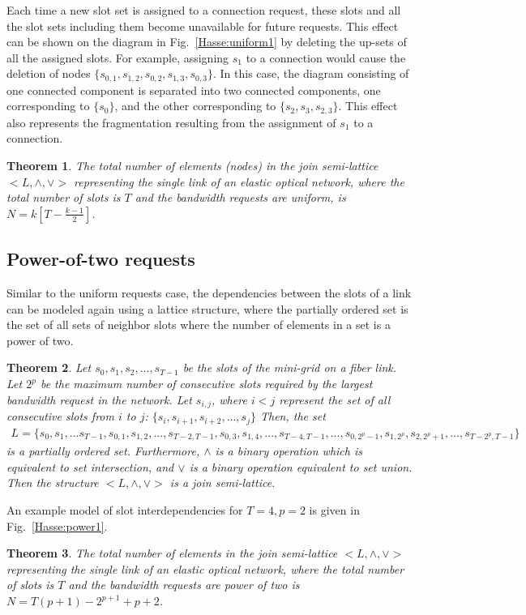 \documentclass[letterpaper,10pt]{article}\pdfoutput=1
\newtheorem{theorem}{Theorem}
\begin{document}
Each time a new slot set is assigned to a connection request, these slots and all the slot sets
including them become unavailable for future requests. This effect can be shown on the diagram in 
Fig.~\ref{Hasse:uniform1} by deleting the up-sets of all the assigned slots. For example, assigning $s_1$ to
a connection would cause the deletion of nodes $\{s_{0,1}, s_{1,2}, s_{0,2}, s_{1,3}, s_{0,3}\}$. In this case,
the diagram consisting of one connected component is separated into two connected components, one corresponding
to $\{s_0\}$, and the other corresponding to $\{s_2, s_3, s_{2,3}\}$. This effect also represents 
the fragmentation resulting from the assignment of $s_1$ to a connection.
\begin{theorem}The total number of elements (nodes) in the join semi-lattice $<L, \wedge, \vee>$ representing the single link of an
elastic optical network, where the total number of slots is $T$ and the bandwidth requests are uniform, is
$N = k \left[ T - \frac{k - 1}{2} \right]$.
\end{theorem}

\subsection{Power-of-two requests}
Similar to the uniform requests case, the dependencies between the slots of a link can be modeled again using a 
lattice structure, where the partially ordered set is the set of all sets of neighbor slots where the number
of elements in a set is a power of two.
\begin{theorem}
Let $s_0, s_1, s_2, ..., s_{T-1}$ be the slots of the mini-grid on a fiber link. 
Let $2^p$ be the maximum number of consecutive slots required by the largest bandwidth request in the network.
Let $s_{i,j}$, where $i < j$ represent the set of all consecutive slots from $i$ to $j$: 
$\{s_{i}, s_{i+1}, s_{i+2}, ..., s_{j}\}$
Then, the set
\begin{eqnarray*}
L = \{s_0, s_1, ... s_{T-1},
s_{0,1}, s_{1,2}, ..., s_{T-2,T-1},
s_{0,3}, s_{1,4}, ..., s_{T-4,T-1},
...,
s_{0,2^{p}-1}, s_{1,2^{p}}, s_{2,2^{p}+1}, ..., s_{T-2^{p}, T-1}\}
\end{eqnarray*}
is a partially ordered set. Furthermore, $\wedge$ is a binary operation which is equivalent to set intersection, 
and $\vee$ is a binary operation equivalent to set union. Then the structure $< L, \wedge, \vee >$ is a join semi-lattice.
\end{theorem}
An example model of slot interdependencies for $T = 4, p = 2$ is given in Fig.~\ref{Hasse:power1}.
\begin{theorem}The total number of elements in the join semi-lattice $<L, \wedge, \vee>$ representing the single link of an
elastic optical network, where the total number of slots is $T$ and the bandwidth requests are power of two is
$N = T (p + 1) - 2^{p+1} + p + 2$.
\end{theorem}
\end{document}
